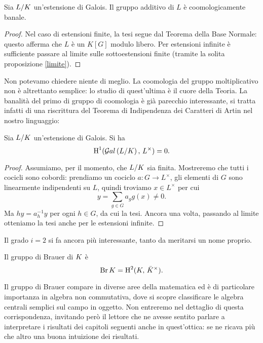 \begin{theorem} \label{Hadd}
	Sia $ L / K $ un'estensione di Galois. Il gruppo additivo di $ L $ è coomologicamente banale.
\end{theorem}
\begin{proof}
	Nel caso di estensioni finite, la tesi segue dal Teorema della Base Normale: questo afferma che $ L $ è un $ K[G] $ modulo libero. Per estensioni infinite è sufficiente passare al limite sulle sottoestensioni finite (tramite la solita proposizione \ref{limite}).
\end{proof}

Non potevamo chiedere niente di meglio. La coomologia del gruppo moltiplicativo non è altrettanto semplice: lo studio di quest'ultima è il cuore della Teoria. La banalità del primo di gruppo di coomologia è già parecchio interessante, si tratta infatti di una riscrittura del Teorema di Indipendenza dei Caratteri di Artin nel nostro linguaggio:

\begin{theorem}[Hilbert 90]\label{H90}
	Sia $ L/K $ un'estensione di Galois. Si ha
	\[ \operatorname{H}^1(\mathcal{G}al\left(  L / K \right), \, L^\times) = 0. \]
\end{theorem}
\begin{proof}
	Assumiamo, per il momento, che $ L/K $ sia finita. Mostreremo che tutti i cocicli sono cobordi: prendiamo un cociclo $ a \colon G \to L^\times $, gli elementi di $ G $ sono linearmente indipendenti su $ L $, quindi troviamo $ x \in L^\times $ per cui
	\[ y = \sum_{g \in G} a_g g(x) \neq 0. \]
	Ma $ hy = a_h^{-1}y $ per ogni $ h \in G $, da cui la tesi.
	Ancora una volta, passando al limite otteniamo la tesi anche per le estensioni infinite. \todo[bruttino]
\end{proof}

Il grado $ i = 2 $ si fa ancora più interessante, tanto da meritarsi un nome proprio.
\begin{definition}
	Il gruppo di Brauer di $ K $ è $$  \operatorname{Br} K = \operatorname{H}^2(K, \, \bar{K}^\times).  $$
\end{definition}

Il gruppo di Brauer compare in diverse aree della matematica ed è di particolare importanza in algebra non commutativa, dove si scopre classificare le algebra centrali semplici sul campo in oggetto. Non entreremo nel dettaglio di questa corrispondenza, invitando però il lettore che ne avesse sentito parlare a interpretare i risultati dei capitoli seguenti anche in quest'ottica: se ne ricava più che altro una buona intuizione dei risultati.

